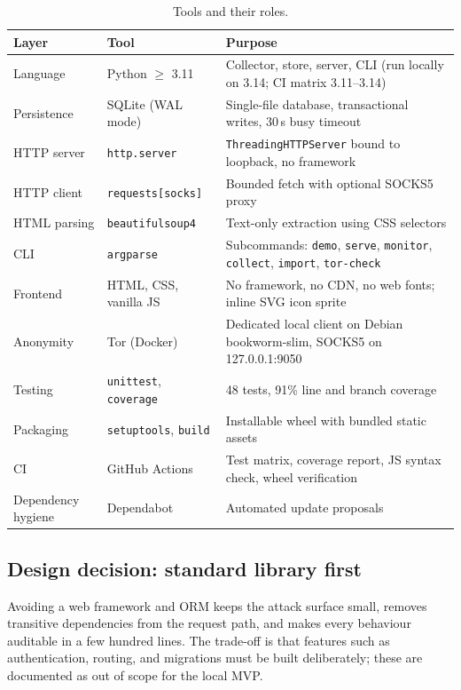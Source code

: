 \documentclass[11pt,a4paper]{article}
\newcommand{\code}[1]{\texttt{\small #1}}
\begin{document}
\begin{table}[H]
\centering
\renewcommand{\arraystretch}{1.25}
\begin{tabularx}{\linewidth}{@{}l l X@{}}
\toprule
\textbf{Layer} & \textbf{Tool} & \textbf{Purpose} \\
\midrule
Language & Python $\ge$ 3.11 & Collector, store, server, CLI (run locally on 3.14; CI matrix 3.11--3.14) \\
Persistence & SQLite (WAL mode) & Single-file database, transactional writes, 30\,s busy timeout \\
HTTP server & \code{http.server} & \code{ThreadingHTTPServer} bound to loopback, no framework \\
HTTP client & \code{requests[socks]} & Bounded fetch with optional SOCKS5 proxy \\
HTML parsing & \code{beautifulsoup4} & Text-only extraction using CSS selectors \\
CLI & \code{argparse} & Subcommands: \code{demo}, \code{serve}, \code{monitor}, \code{collect}, \code{import}, \code{tor-check} \\
Frontend & HTML, CSS, vanilla JS & No framework, no CDN, no web fonts; inline SVG icon sprite \\
Anonymity & Tor (Docker) & Dedicated local client on Debian bookworm-slim, SOCKS5 on 127.0.0.1:9050 \\
Testing & \code{unittest}, \code{coverage} & 48 tests, 91\% line and branch coverage \\
Packaging & \code{setuptools}, \code{build} & Installable wheel with bundled static assets \\
CI & GitHub Actions & Test matrix, coverage report, JS syntax check, wheel verification \\
Dependency hygiene & Dependabot & Automated update proposals \\
\bottomrule
\end{tabularx}
\caption{Tools and their roles.}
\end{table}

\subsection{Design decision: standard library first}
Avoiding a web framework and ORM keeps the attack surface small, removes transitive dependencies from the request path, and makes every behaviour auditable in a few hundred lines. The trade-off is that features such as authentication, routing, and migrations must be built deliberately; these are documented as out of scope for the local MVP.
\end{document}
